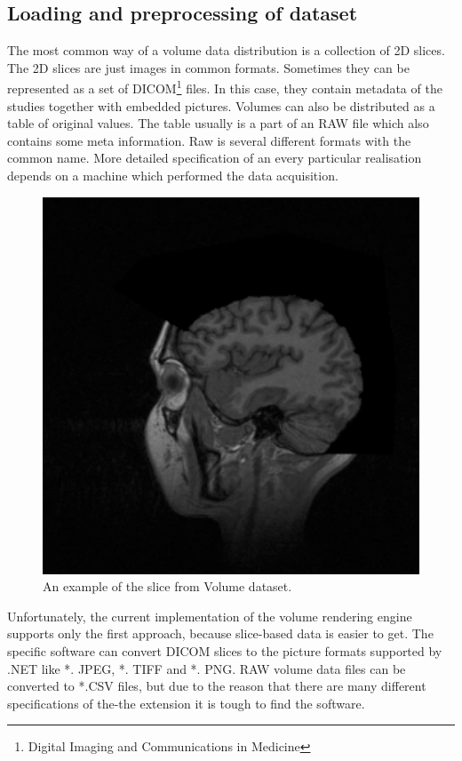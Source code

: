 \documentclass[twoside, english, 11pt]{report}
\begin{document}
\subsection{Loading and preprocessing of dataset}
The most common way of a volume data distribution is a collection of 2D slices. The 2D slices are just images in common formats. Sometimes they can be represented as a set of DICOM\footnote{Digital Imaging and Communications in Medicine} files. In this case, they contain metadata of the studies together with embedded pictures. Volumes can also be distributed as a table of original values. The table usually is a part of an RAW file which also contains some meta information. Raw is several different formats with the common name. More detailed specification of an every particular realisation depends on a machine which performed the data acquisition.\\
\begin{figure}[!h]
\centerline{\includegraphics[scale = 0.35]{img/slice}}
\caption{An example of the slice from Volume dataset.\label{fig:slice}}
\end{figure}
Unfortunately, the current implementation of the volume rendering engine supports only the first approach, because slice-based data is easier to get. The specific software can convert DICOM slices to the picture formats supported by .NET like *. JPEG, *. TIFF and *. PNG. RAW volume data files can be converted to *.CSV files, but due to the reason that there are many different specifications of the-the extension it is tough to find the software.\\
\end{document}
